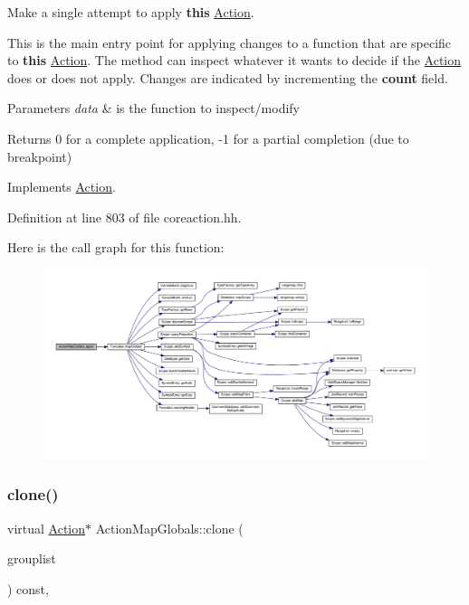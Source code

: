 Make a single attempt to apply {\bfseries{this}} \mbox{\hyperlink{class_action}{Action}}. 

This is the main entry point for applying changes to a function that are specific to {\bfseries{this}} \mbox{\hyperlink{class_action}{Action}}. The method can inspect whatever it wants to decide if the \mbox{\hyperlink{class_action}{Action}} does or does not apply. Changes are indicated by incrementing the {\bfseries{count}} field. 
\begin{DoxyParams}{Parameters}
{\em data} & is the function to inspect/modify \\
\hline
\end{DoxyParams}
\begin{DoxyReturn}{Returns}
0 for a complete application, -\/1 for a partial completion (due to breakpoint) 
\end{DoxyReturn}


Implements \mbox{\hyperlink{class_action_aac1c3999d6c685b15f5d9765a4d04173}{Action}}.



Definition at line 803 of file coreaction.\+hh.

Here is the call graph for this function\+:
\nopagebreak
\begin{figure}[H]
\begin{center}
\leavevmode
\includegraphics[width=350pt]{class_action_map_globals_a8d9376bd7f1d026c922f20f4b069e739_cgraph}
\end{center}
\end{figure}
\mbox{\label{class_action_map_globals_ae5d0f824a0c3e33c588a7d90ed1ab3f5}} 
\subsubsection{\texorpdfstring{clone()}{clone()}}
{\footnotesize\ttfamily virtual \mbox{\hyperlink{class_action}{Action}}$\ast$ Action\+Map\+Globals\+::clone (\begin{DoxyParamCaption}\item[{const \mbox{\hyperlink{class_action_group_list}{Action\+Group\+List}} \&}]{grouplist }\end{DoxyParamCaption}) const\hspace{0.3cm}{\ttfamily [inline]}, {\ttfamily [virtual]}}



